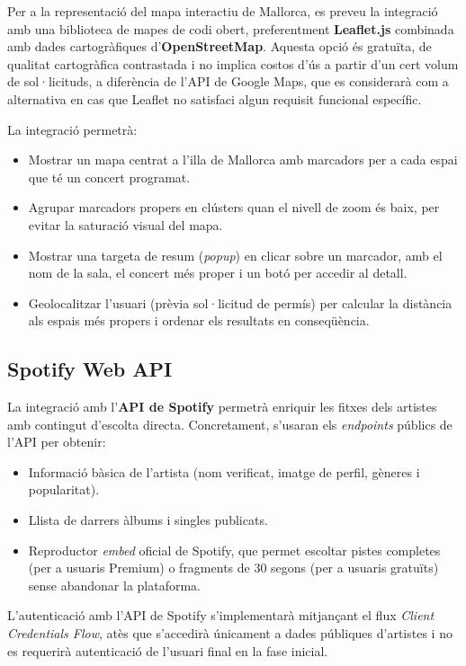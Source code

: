 Per a la representació del mapa interactiu de Mallorca, es preveu la integració amb una biblioteca de mapes de codi obert, preferentment \textbf{Leaflet.js} combinada amb dades cartogràfiques d'\textbf{OpenStreetMap}. Aquesta opció és gratuïta, de qualitat cartogràfica contrastada i no implica costos d'ús a partir d'un cert volum de sol·licituds, a diferència de l'API de Google Maps, que es considerarà com a alternativa en cas que Leaflet no satisfaci algun requisit funcional específic.

La integració permetrà:
\begin{itemize}
    \item Mostrar un mapa centrat a l'illa de Mallorca amb marcadors per a cada espai que té un concert programat.
    \item Agrupar marcadors propers en clústers quan el nivell de zoom és baix, per evitar la saturació visual del mapa.
    \item Mostrar una targeta de resum (\textit{popup}) en clicar sobre un marcador, amb el nom de la sala, el concert més proper i un botó per accedir al detall.
    \item Geolocalitzar l'usuari (prèvia sol·licitud de permís) per calcular la distància als espais més propers i ordenar els resultats en conseqüència.
\end{itemize}

\subsection{Spotify Web API}

La integració amb l'\textbf{API de Spotify} permetrà enriquir les fitxes dels artistes amb contingut d'escolta directa. Concretament, s'usaran els \textit{endpoints} públics de l'API per obtenir:

\begin{itemize}
    \item Informació bàsica de l'artista (nom verificat, imatge de perfil, gèneres i popularitat).
    \item Llista de darrers àlbums i singles publicats.
    \item Reproductor \textit{embed} oficial de Spotify, que permet escoltar pistes completes (per a usuaris Premium) o fragments de 30 segons (per a usuaris gratuïts) sense abandonar la plataforma.
\end{itemize}

L'autenticació amb l'API de Spotify s'implementarà mitjançant el flux \textit{Client Credentials Flow}, atès que s'accedirà únicament a dades públiques d'artistes i no es requerirà autenticació de l'usuari final en la fase inicial.

